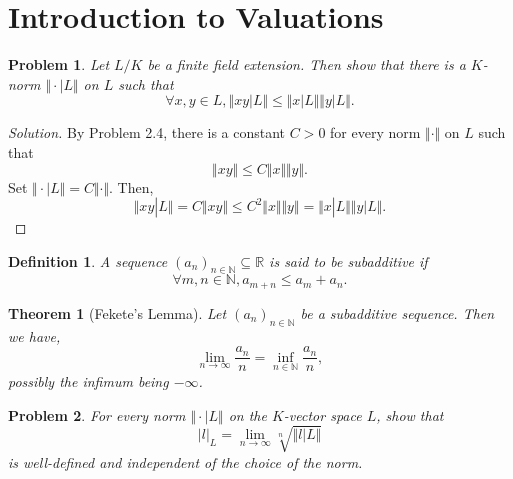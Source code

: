 \documentclass[8pt]{article}
\numberwithin{equation}{section}
\newenvironment{solution}{\begin{proof}[Solution]}{\end{proof}}
\newtheorem{theorem}{Theorem} [section]
\newtheorem{definition}{Definition}[section]
\newtheorem{problem}{Problem}[section]
\newcommand{\norm}[1]{\Vert #1 \Vert}
\newcommand{\N}[0]{\mathbb{N}}
\newcommand{\R}[0]{\mathbb{R}}
\newcommand{\ab}[1]{\vert #1 \vert}
\begin{document}
\section{Introduction to Valuations}
\begin{problem}
  Let $L/K$ be a finite field extension. Then show that there is a $K$-norm $\norm{\cdot|L}$ on $L$ such that 
  \begin{equation*}
    \forall x,y\in L,\norm{xy|L}\leq \norm{x|L}\norm{y|L}.
  \end{equation*}
\end{problem}
\begin{solution}
  By Problem 2.4, there is a constant $C>0$ for every norm $\norm{\cdot}$ on $L$ such that 
  \begin{equation*}
    \norm{xy}\leq C\norm{x}\norm{y}.
  \end{equation*}
  Set $\norm{\cdot|L} = C\norm{\cdot}$. Then,
  \begin{equation*}
    \norm{xy|L} = C\norm{xy}\leq C^2\norm{x}\norm{y} = \norm{x|L}\norm{y|L}.
  \end{equation*}
\end{solution}
\begin{definition}
  A sequence $(a_n)_{n\in\N}\subseteq\R$ is said to be subadditive if 
  \begin{equation*}
    \forall m,n\in\N, a_{m+n}\leq a_m+a_n.
  \end{equation*}
\end{definition}
\begin{theorem}[Fekete's Lemma]
  Let $(a_n)_{n\in\N}$ be a subadditive sequence. Then we have,
  \begin{equation*}
    \lim_{n\to\infty}{\frac {a_n} n} = \inf_{n\in\N}{\frac {a_n} n},
  \end{equation*}
  possibly the infimum being $-\infty$.
\end{theorem}
\begin{problem}
  For every norm $\norm{\cdot|L}$ on the $K$-vector space $L$, show that 
  \begin{equation*}
    \ab{l}_L = \lim_{n\to\infty}\sqrt[n]{\norm{l|L}}
  \end{equation*}
  is well-defined and independent of the choice of the norm.
\end{problem}
\end{document}
